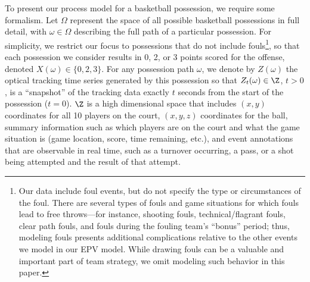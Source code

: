 \documentclass[EPV_JASA.tex]{subfiles}
\begin{document}
To present our process model for a basketball possession, we require some formalism. Let $\Omega$ represent the space of all possible basketball possessions in full detail, with $\omega \in \Omega$ describing the full path of a particular possession. For simplicity, we restrict our focus to possessions that do not include fouls\footnote{Our data include foul events, but do not specify the type or circumstances of the foul. There are several types of fouls and game situations for which fouls lead to free throws---for instance, shooting fouls, technical/flagrant fouls, clear path fouls, and fouls during the fouling team's ``bonus'' period; thus, modeling fouls presents additional complications relative to the other events we model in our EPV model. While drawing fouls can be a valuable and important part of team strategy, we omit modeling such behavior in this paper.}, so that each possession we consider results in 0, 2, or 3 points scored for the offense, denoted $X(\omega) \in \{0, 2, 3\}$. %
For any possession path $\omega$, we denote by $Z(\omega)$ the optical tracking time series generated by this possession so that $Z_t(\omega) \in \Z$, $t > 0$, is a ``snapshot'' of the tracking data exactly $t$ seconds from the start of the possession ($t=0$). $\Z$ is a high dimensional space that includes $(x,y)$ coordinates for all 10 players on the court, $(x,y,z)$ coordinates for the ball, summary information such as which players are on the court and what the game situation is (game location, score, time remaining, etc.), and event annotations that are observable in real time, such as a turnover occurring, a pass, or a shot being attempted and the result of that attempt.
\end{document}
